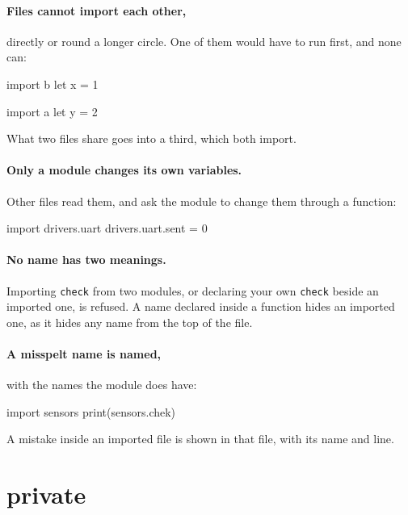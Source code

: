 \paragraph{Files cannot import each other,} directly or round a longer
circle. One of them would have to run first, and none can:

\begin{zeno}[file=a.zeno, dir=circle, run=no]
import b
let x = 1
\end{zeno}

\begin{zeno}[file=b.zeno, dir=circle, fails=yes]
import a
let y = 2
\end{zeno}

What two files share goes into a third, which both import.

\paragraph{Only a module changes its own variables.} Other files read
them, and ask the module to change them through a function:

\begin{zeno}[file=meddle.zeno, dir=station, fails=yes]
import drivers.uart
drivers.uart.sent = 0
\end{zeno}

\paragraph{No name has two meanings.} Importing \verb|check| from two
modules, or declaring your own \verb|check| beside an imported one, is
refused. A name declared inside a function hides an imported one, as
it hides any name from the top of the file.

\paragraph{A misspelt name is named,} with the names the module does
have:

\begin{zeno}[file=typo.zeno, dir=station, fails=yes]
import sensors
print(sensors.chek)
\end{zeno}

A mistake inside an imported file is shown in that file, with its
name and line.

\section{private}

